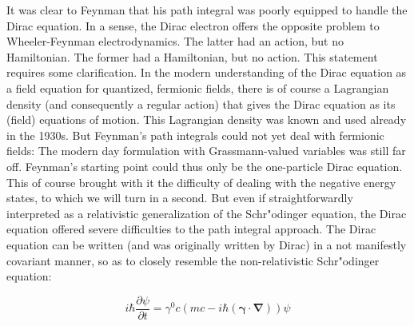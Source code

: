 \documentclass[12pt,a4paper]{article}
\begin{document}
It was clear to Feynman that his path integral was poorly equipped to handle the Dirac equation. In a sense, the Dirac electron offers the opposite problem to Wheeler-Feynman electrodynamics. The latter had an action, but no Hamiltonian. The former had a Hamiltonian, but no action. This statement requires some clarification. In the modern understanding of the Dirac equation as a field equation for quantized, fermionic fields, there is of course a Lagrangian density (and consequently a regular action) that gives the Dirac equation as its (field) equations of motion. This Lagrangian density was known and used already in the 1930s. But Feynman's path integrals could not yet deal with fermionic fields: The modern day formulation with Grassmann-valued variables was still far off. Feynman's starting point could thus only be the one-particle Dirac equation. This of course brought with it the difficulty of dealing with the negative energy states, to which we will turn in a second. But even if straightforwardly interpreted as a relativistic generalization of the Schr"odinger equation, the Dirac equation offered severe difficulties to the path integral approach. The Dirac equation can be written (and was originally written by Dirac) in a not manifestly covariant manner, so as to closely resemble the non-relativistic Schr"odinger equation:

\begin{equation}
i \hbar \frac{\partial \psi}{\partial t} = \gamma^0 c \left( mc - i \hbar \left( \mathbf{\gamma} \cdot \mathbf{\nabla} \right)\right) \psi
\end{equation}
\end{document}
